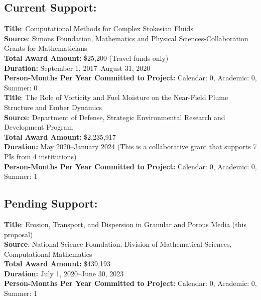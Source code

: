 \documentclass[11pt]{article}
\begin{document}
\subsection*{Current Support:}
{\bf Title}: Computational Methods for Complex Stokesian Fluids \\
{\bf Source}: Simons Foundation, Mathematics and Physical
Sciences-Collaboration Grants for Mathematicians \\
{\bf Total Award Amount:} \$25,200 (Travel funds only) \\
{\bf Duration:} September 1, 2017--August 31, 2020 \\
{\bf Person-Months Per Year Committed to Project:} Calendar: 0,
Academic: 0, Summer: 0 \\

\noindent
{\bf Title}: The Role of Vorticity and Fuel Moisture on the Near-Field
Plume Structure and Ember Dynamics \\
{\bf Source}: Department of Defense, Strategic Environmental Research
and Development Program \\
{\bf Total Award Amount:} \$2,235,917 \\
{\bf Duration:} May 2020--January 2024 (This is a collaborative grant
that supports 7 PIs from 4 institutions) \\
{\bf Person-Months Per Year Committed to Project:} Calendar: 0,
Academic: 0, Summer: 1 \\


\vspace{-17pt}
\subsection*{Pending Support:}
{\bf Title}: Erosion, Transport, and Dispersion in Granular and Porous
Media (this proposal) \\
{\bf Source}: National Science Foundation, Division of Mathematical
Sciences, Computational Mathematics \\
{\bf Total Award Amount:} \$439,193 \\
{\bf Duration:} July 1, 2020--June 30, 2023 \\
{\bf Person-Months Per Year Committed to Project:} Calendar: 0,
Academic: 0, Summer: 1 \\
\end{document}
